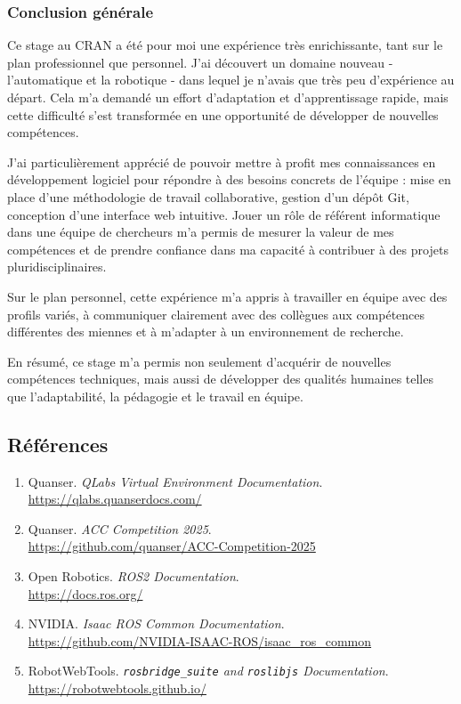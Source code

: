\documentclass{name}
\begin{document}
\subsubsection{Conclusion générale}

Ce stage au CRAN a été pour moi une expérience très enrichissante, tant sur le plan professionnel que personnel. J'ai découvert un domaine nouveau - l'automatique et la robotique - dans lequel je n'avais que très peu d'expérience au départ. Cela m'a demandé un effort d'adaptation et d'apprentissage rapide, mais cette difficulté s'est transformée en une opportunité de développer de nouvelles compétences.

J'ai particulièrement apprécié de pouvoir mettre à profit mes connaissances en développement logiciel pour répondre à des besoins concrets de l'équipe : mise en place d'une méthodologie de travail collaborative, gestion d'un dépôt Git, conception d'une interface web intuitive. Jouer un rôle de référent informatique dans une équipe de chercheurs m'a permis de mesurer la valeur de mes compétences et de prendre confiance dans ma capacité à contribuer à des projets pluridisciplinaires.

Sur le plan personnel, cette expérience m'a appris à travailler en équipe avec des profils variés, à communiquer clairement avec des collègues aux compétences différentes des miennes et à m'adapter à un environnement de recherche.

En résumé, ce stage m'a permis non seulement d'acquérir de nouvelles compétences techniques, mais aussi de développer des qualités humaines telles que l'adaptabilité, la pédagogie et le travail en équipe.

\newpage

\subsection*{Références}

\begin{enumerate}
    \item Quanser. \textit{QLabs Virtual Environment Documentation}. \\\url{https://qlabs.quanserdocs.com/}
    \item Quanser. \textit{ACC Competition 2025}. \\\url{https://github.com/quanser/ACC-Competition-2025}
    \item Open Robotics. \textit{ROS2 Documentation}. \\\url{https://docs.ros.org/}
    \item NVIDIA. \textit{Isaac ROS Common Documentation}. \\\url{https://github.com/NVIDIA-ISAAC-ROS/isaac\_ros\_common}
    \item RobotWebTools. \textit{\texttt{rosbridge\_suite} and \texttt{roslibjs} Documentation}. \\\url{https://robotwebtools.github.io/}
\end{enumerate}
\end{document}
